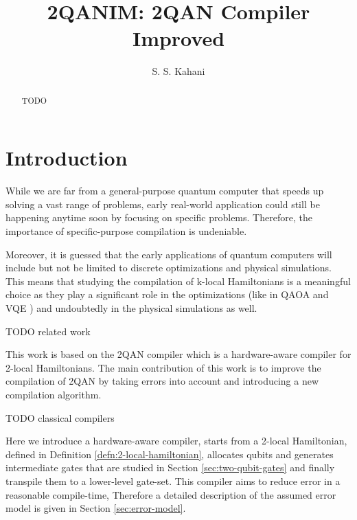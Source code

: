 \documentclass{article}
\title{2QANIM: 2QAN Compiler Improved}
\author{S. S. Kahani}
\begin{document}
  \maketitle
  \begin{abstract}
    { \color{blue} TODO }
  \end{abstract}

  \section{Introduction}
  
  While we are far from a general-purpose quantum computer 
  \cite{?} %
  that speeds up solving a vast range of problems, early real-world application could still be happening anytime soon by focusing on specific problems.
  Therefore, the importance of specific-purpose compilation is undeniable.
  
  Moreover, it is guessed that the early applications of quantum computers will include but not be limited to discrete optimizations and physical simulations.
  \cite{?} %
  This means that studying the compilation of k-local Hamiltonians is a meaningful choice as they play a significant role in the optimizations (like in QAOA \cite{?} and VQE \cite{?}) and undoubtedly in the physical simulations as well. 
  \cite{?} %

  { \color{blue} TODO related work }
  
  This work is based on the 2QAN compiler \cite{?} which is a hardware-aware compiler for 2-local Hamiltonians. The main contribution of this work is to improve the compilation of 2QAN by taking errors into account and introducing a new compilation algorithm. 

  { \color{blue} TODO classical compilers }

  Here we introduce a hardware-aware compiler, starts from a 2-local Hamiltonian, defined in Definition \ref{defn:2-local-hamiltonian}, allocates qubits and generates intermediate gates that are studied in Section \ref{sec:two-qubit-gates} and finally transpile them to a lower-level gate-set. This compiler aims to reduce error in a reasonable compile-time, Therefore a detailed description of the assumed error model is given in Section \ref{sec:error-model}.
\end{document}

